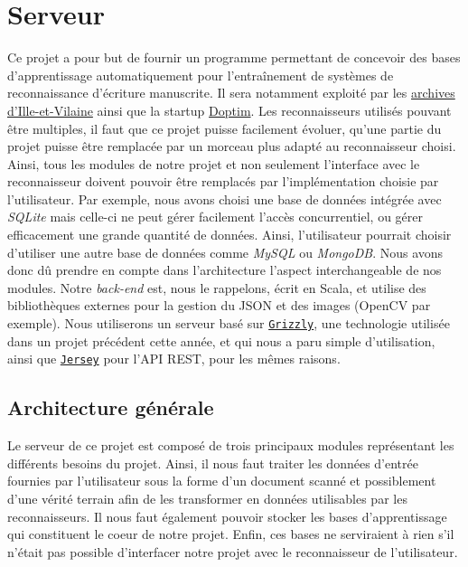 \chapter{Serveur}

Ce projet a pour but de fournir un programme permettant de concevoir des bases d'apprentissage automatiquement pour l'entraînement de systèmes de reconnaissance d'écriture manuscrite. Il sera notamment exploité par les \href{http://archives.ille-et-vilaine.fr/fr}{archives d'Ille-et-Vilaine} ainsi que la startup \href{http://www.doptim.eu}{Doptim}. Les reconnaisseurs utilisés pouvant être multiples, il faut que ce projet puisse facilement évoluer, qu'une partie du projet puisse être remplacée par un morceau plus adapté au reconnaisseur choisi. Ainsi, tous les modules de notre projet et non seulement l'interface avec le reconnaisseur doivent pouvoir être remplacés par l'implémentation choisie par l'utilisateur. Par exemple, nous avons choisi une base de données intégrée avec \textit{SQLite} mais celle-ci ne peut gérer facilement l'accès concurrentiel, ou gérer efficacement une grande quantité de données. Ainsi, l'utilisateur pourrait choisir d'utiliser une autre base de données comme \textit{MySQL} ou \textit{MongoDB}. Nous avons donc dû prendre en compte dans l'architecture l'aspect interchangeable de nos modules. Notre \textit{back-end} est, nous le rappelons, écrit en Scala, et utilise des bibliothèques externes pour la gestion du JSON et des images (OpenCV par exemple). Nous utiliserons un serveur basé sur \href{https://javaee.github.io/grizzly}{\texttt{Grizzly}}, une technologie utilisée dans un projet précédent cette année, et qui nous a paru simple d'utilisation, ainsi que \href{https://jersey.github.io}{\texttt{Jersey}} pour l'API REST, pour les mêmes raisons.

\section{Architecture générale}

Le serveur de ce projet est composé de trois principaux modules représentant les différents besoins du projet. Ainsi, il nous faut traiter les données d'entrée fournies par l'utilisateur sous la forme d'un document scanné et possiblement d'une vérité terrain afin de les transformer en données utilisables par les reconnaisseurs. Il nous faut également pouvoir stocker les bases d'apprentissage qui constituent le coeur de notre projet. Enfin, ces bases ne serviraient à rien s'il n'était pas possible d'interfacer notre projet avec le reconnaisseur de l'utilisateur.

